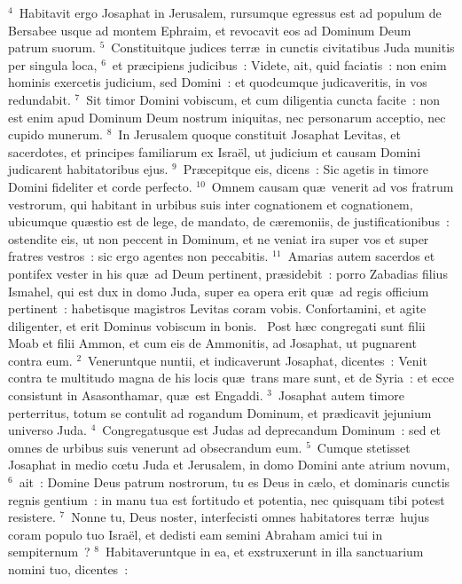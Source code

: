 ${}^{4}$~Habitavit ergo Josaphat in Jerusalem, rursumque egressus est ad populum de Bersabee usque ad montem Ephraim, et revocavit eos ad Dominum Deum patrum suorum.
${}^{5}$~Constituitque judices terr\ae\ in cunctis civitatibus Juda munitis per singula loca,
${}^{6}$~et pr\ae cipiens judicibus~: Videte, ait, quid faciatis~: non enim hominis exercetis judicium, sed Domini~: et quodcumque judicaveritis, in vos redundabit.
${}^{7}$~Sit timor Domini vobiscum, et cum diligentia cuncta facite~: non est enim apud Dominum Deum nostrum iniquitas, nec personarum acceptio, nec cupido munerum.
${}^{8}$~In Jerusalem quoque constituit Josaphat Levitas, et sacerdotes, et principes familiarum ex Isra\"el, ut judicium et causam Domini judicarent habitatoribus ejus.
${}^{9}$~Pr\ae cepitque eis, dicens~: Sic agetis in timore Domini fideliter et corde perfecto.
${}^{10}$~Omnem causam qu\ae\ venerit ad vos fratrum vestrorum, qui habitant in urbibus suis inter cognationem et cognationem, ubicumque qu\ae stio est de lege, de mandato, de c\ae remoniis, de justificationibus~: ostendite eis, ut non peccent in Dominum, et ne veniat ira super vos et super fratres vestros~: sic ergo agentes non peccabitis.
${}^{11}$~Amarias autem sacerdos et pontifex vester in his qu\ae\ ad Deum pertinent, pr\ae sidebit~: porro Zabadias filius Ismahel, qui est dux in domo Juda, super ea opera erit qu\ae\ ad regis officium pertinent~: habetisque magistros Levitas coram vobis. Confortamini, et agite diligenter, et erit Dominus vobiscum in bonis.
~Post h\ae c congregati sunt filii Moab et filii Ammon, et cum eis de Ammonitis, ad Josaphat, ut pugnarent contra eum.
${}^{2}$~Veneruntque nuntii, et indicaverunt Josaphat, dicentes~: Venit contra te multitudo magna de his locis qu\ae\ trans mare sunt, et de Syria~: et ecce consistunt in Asasonthamar, qu\ae\ est Engaddi.
${}^{3}$~Josaphat autem timore perterritus, totum se contulit ad rogandum Dominum, et pr\ae dicavit jejunium universo Juda.
${}^{4}$~Congregatusque est Judas ad deprecandum Dominum~: sed et omnes de urbibus suis venerunt ad obsecrandum eum.
${}^{5}$~Cumque stetisset Josaphat in medio cœtu Juda et Jerusalem, in domo Domini ante atrium novum,
${}^{6}$~ait~: Domine Deus patrum nostrorum, tu es Deus in c\ae lo, et dominaris cunctis regnis gentium~: in manu tua est fortitudo et potentia, nec quisquam tibi potest resistere.
${}^{7}$~Nonne tu, Deus noster, interfecisti omnes habitatores terr\ae\ hujus coram populo tuo Isra\"el, et dedisti eam semini Abraham amici tui in sempiternum~?
${}^{8}$~Habitaveruntque in ea, et exstruxerunt in illa sanctuarium nomini tuo, dicentes~:
